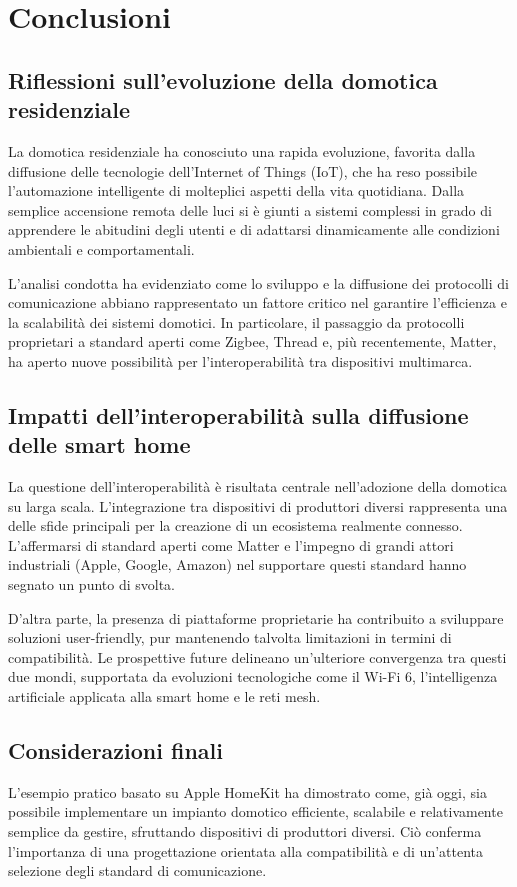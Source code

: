 \chapter{Conclusioni}
\section{Riflessioni sull'evoluzione della domotica residenziale}
La domotica residenziale ha conosciuto una rapida evoluzione, favorita dalla diffusione delle tecnologie dell'Internet of Things (IoT), che ha reso possibile l'automazione intelligente di molteplici aspetti della vita quotidiana. Dalla semplice accensione remota delle luci si è giunti a sistemi complessi in grado di apprendere le abitudini degli utenti e di adattarsi dinamicamente alle condizioni ambientali e comportamentali.

L'analisi condotta ha evidenziato come lo sviluppo e la diffusione dei protocolli di comunicazione abbiano rappresentato un fattore critico nel garantire l'efficienza e la scalabilità dei sistemi domotici. In particolare, il passaggio da protocolli proprietari a standard aperti come Zigbee, Thread e, più recentemente, Matter, ha aperto nuove possibilità per l'interoperabilità tra dispositivi multimarca.

\section{Impatti dell'interoperabilità sulla diffusione delle smart home}
La questione dell'interoperabilità è risultata centrale nell'adozione della domotica su larga scala. L'integrazione tra dispositivi di produttori diversi rappresenta una delle sfide principali per la creazione di un ecosistema realmente connesso. L'affermarsi di standard aperti come Matter e l'impegno di grandi attori industriali (Apple, Google, Amazon) nel supportare questi standard hanno segnato un punto di svolta.

D'altra parte, la presenza di piattaforme proprietarie ha contribuito a sviluppare soluzioni user-friendly, pur mantenendo talvolta limitazioni in termini di compatibilità. Le prospettive future delineano un'ulteriore convergenza tra questi due mondi, supportata da evoluzioni tecnologiche come il Wi-Fi 6, l'intelligenza artificiale applicata alla smart home e le reti mesh.

\section{Considerazioni finali}
L'esempio pratico basato su Apple HomeKit ha dimostrato come, già oggi, sia possibile implementare un impianto domotico efficiente, scalabile e relativamente semplice da gestire, sfruttando dispositivi di produttori diversi. Ciò conferma l'importanza di una progettazione orientata alla compatibilità e di un'attenta selezione degli standard di comunicazione.

